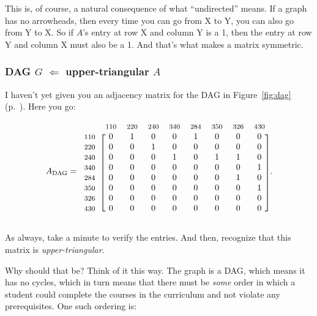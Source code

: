 \begin{alttitles}
This is, of course, a natural consequence of what ``undirected'' means. If a
graph has no arrowheads, then every time you can go from X to Y, you can also
go from Y to X. So if $A$'s entry at row X and column Y is a 1, then the entry
at row Y and column X must also be a 1. And that's what makes a matrix
symmetric.


\subsubsection{DAG $G$ $\Leftarrow$ upper-triangular $A$}

I haven't yet given you an adjacency matrix for the DAG in Figure~\ref{fig:dag}
(p.~\pageref{fig:dag}). Here you go:

\[
A_{\textrm{DAG}} = 
\begin{blockarray}{ccccccccc}
& {\footnotesize\textrm{110}}
& {\footnotesize\textrm{220}}
& {\footnotesize\textrm{240}}
& {\footnotesize\textrm{340}}
& {\footnotesize\textrm{284}}
& {\footnotesize\textrm{350}}
& {\footnotesize\textrm{326}}
& {\footnotesize\textrm{430}} \\
\begin{block}{c[cccccccc]}
{\footnotesize\textrm{110}} & 0 & 1 & 0 & 0 & 1 & 0 & 0 & 0 \\
{\footnotesize\textrm{220}} & 0 & 0 & 1 & 0 & 0 & 0 & 0 & 0 \\
{\footnotesize\textrm{240}} & 0 & 0 & 0 & 1 & 0 & 1 & 1 & 0 \\
{\footnotesize\textrm{340}} & 0 & 0 & 0 & 0 & 0 & 0 & 0 & 1 \\
{\footnotesize\textrm{284}} & 0 & 0 & 0 & 0 & 0 & 0 & 1 & 0 \\
{\footnotesize\textrm{350}} & 0 & 0 & 0 & 0 & 0 & 0 & 0 & 1 \\
{\footnotesize\textrm{326}} & 0 & 0 & 0 & 0 & 0 & 0 & 0 & 0 \\
{\footnotesize\textrm{430}} & 0 & 0 & 0 & 0 & 0 & 0 & 0 & 0 \\
\end{block}
\end{blockarray}.
\]


As always, take a minute to verify the entries. And then, recognize that this
matrix is \textit{upper-triangular}.

Why should that be? Think of it this way. The graph is a DAG, which means it
has no cycles, which in turn means that there must be \textit{some} order in
which a student could complete the courses in the curriculum and not violate
any prerequisites. One such ordering is:


\end{alttitles}

